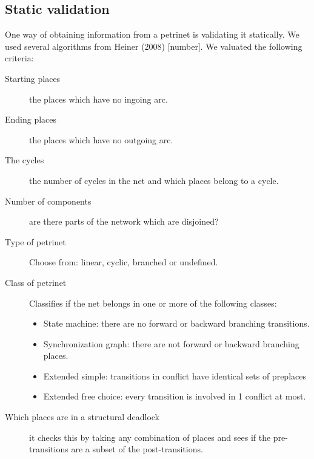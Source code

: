 \documentclass[12pt,a4paper,draft]{article}
\begin{document}
    
    
\subsection{Static validation}\label{sec:static_validation}
    One way of obtaining information from a petrinet is validating it statically. We used several algorithms from Heiner (2008) [number]. We valuated the following criteria:
    \begin{description}
        
    \item [Starting places] the places which have no ingoing arc.
    
    \item [Ending places]\label{item:ending_places} the places which have no outgoing arc.
    
    \item [The cycles] the number of cycles in the net and which places belong to a cycle.
    
    \item [Number of components] are there parts of the network which are disjoined?

    \item [Type of petrinet] Choose from: linear, cyclic, branched or undefined.

    \item [Class of petrinet] Classifies if the net belongs in one or more of the following classes:
    \begin{itemize}
        \item State machine: there are no forward or backward branching transitions.
        \item Synchronization graph: there are not forward or backward branching places.
        \item Extended simple: transitions in conflict have identical sets of preplaces
        \item Extended free choice: every transition is involved in 1 conflict at most.
    \end{itemize}
    
    \item [Which places are in a structural deadlock] it checks this by taking any combination of places and sees if the pre-transitions are a subset of the post-transitions.
    

\end{description}
\end{document}
